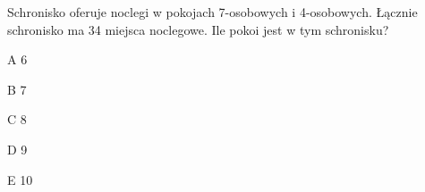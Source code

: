 \begin{tresc}
Schronisko oferuje noclegi w pokojach 7-osobowych i 4-osobowych. Łącznie schronisko ma 34 miejsca noclegowe. Ile pokoi jest w tym schronisku?
\end{tresc}
\begin{wariant}{A} 6 \end{wariant}
\begin{wariant}{B} 7 \end{wariant}
\begin{wariant}{C} 8 \end{wariant}
\begin{wariant}{D} 9 \end{wariant}
\begin{wariant}{E} 10 \end{wariant}
